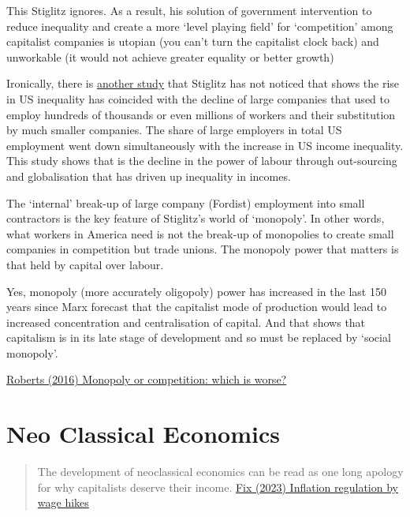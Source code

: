 \documentclass[
]{book}
\begin{document}
This Stiglitz ignores. As a result, his solution of government intervention to reduce inequality and create a more `level playing field' for `competition' among capitalist companies is utopian (you can't turn the capitalist clock back) and unworkable (it would not achieve greater equality or better growth)

Ironically, there is \href{https://www.researchgate.net/publication/228658957_Corporations_and_Economic_Inequality_Around_the_World_The_Paradox_of_Hierarchy}{another study} that Stiglitz has not noticed that shows the rise in US inequality has coincided with the decline of large companies that used to employ hundreds of thousands or even millions of workers and their substitution by much smaller companies. The share of large employers in total US employment went down simultaneously with the increase in US income inequality. This study shows that is the decline in the power of labour through out-sourcing and globalisation that has driven up inequality in incomes.

The `internal' break-up of large company (Fordist) employment into small contractors is the key feature of Stiglitz's world of `monopoly'. In other words, what workers in America need is not the break-up of monopolies to create small companies in competition but trade unions. The monopoly power that matters is that held by capital over labour.

Yes, monopoly (more accurately oligopoly) power has increased in the last 150 years since Marx forecast that the capitalist mode of production would lead to increased concentration and centralisation of capital. And that shows that capitalism is in its late stage of development and so must be replaced by `social monopoly'.

\href{https://thenextrecession.wordpress.com/2016/05/17/monopoly-or-competition-which-is-worse/}{Roberts (2016) Monopoly or competition: which is worse?}

\hypertarget{neo-classical-economics}{%
\chapter{Neo Classical Economics}\label{neo-classical-economics}}

\begin{quote}
The development of neoclassical economics can be read as one long apology for why capitalists deserve their income.
\href{https://economicsfromthetopdown.com/2023/03/02/the-key-to-managing-inflation-higher-wages/}{Fix (2023) Inflation regulation by wage hikes}
\end{quote}
\end{document}
